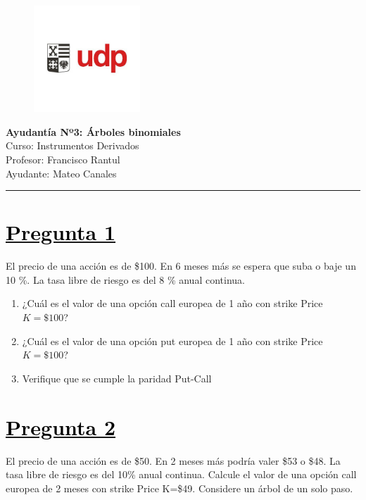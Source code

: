 \documentclass[12pt]{article}
\newcommand{\subrayadoRojo}[1]{{\color{rojoudp}\underline{\textcolor{black}{#1}}}}
\begin{document}
\begin{figure}
    \vspace{-5em}    
    \flushright
    \includegraphics[height=4cm]{../imagenes/logo.png}\\[-3em]
\end{figure}
\begin{center}
    {\LARGE \textbf{Ayudantía Nº3: Árboles binomiales}}\\[0.5em]
    Curso: Instrumentos Derivados\\
    Profesor: Francisco Rantul\\
    Ayudante: Mateo Canales\\
\end{center}
\vspace{1pt}
{\color{rojoudp}\hrule height 2pt}
\vspace{10pt}

\section*{\subrayadoRojo{Pregunta 1}}
El precio de una acción es de \$100. En 6 meses más se espera que suba o baje un 10 \%.
La tasa libre de riesgo es del 8 \% anual continua. 


\begin{enumerate}[label=\textbf{\alph*)}]
    \item	¿Cuál es el valor de una opción call europea de 1 año con strike Price $ K = \$100 $?
    \item	¿Cuál es el valor de una opción put europea de 1 año con strike Price $ K = \$100 $?
    \item   Verifique que se cumple la paridad Put-Call
\end{enumerate}

\section*{\subrayadoRojo{Pregunta 2}}
El precio de una acción es de \$50. En 2 meses más podría valer \$53 o \$48. La tasa libre de riesgo es del 10\%
anual continua. Calcule el valor de una opción call europea de 2 meses con strike Price K=\$49. 
Considere un árbol de un solo paso.  
\end{document}
